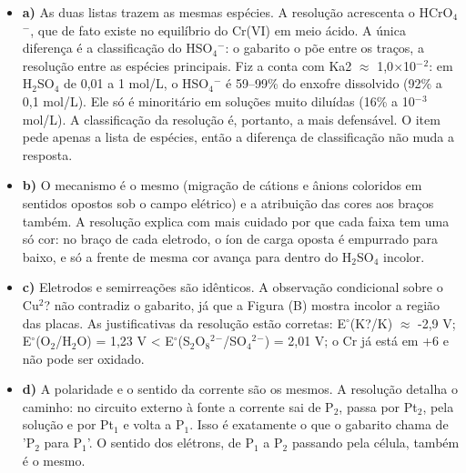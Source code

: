 \documentclass{article}%
\begin{document}
\begin{itemize}%
\item%
\textbf{a)} As duas listas trazem as mesmas espécies. A resolução acrescenta o HCrO$_{4}$$^{-}$, que de fato existe no equilíbrio do Cr(VI) em meio ácido. A única diferença é a classificação do HSO$_{4}$$^{-}$: o gabarito o põe entre os traços, a resolução entre as espécies principais. Fiz a conta com Ka2 $\approx$ 1,0$\times$10$^{-}$$^2$: em H$_{2}$SO$_{4}$ de 0,01 a 1 mol/L, o HSO$_{4}$$^{-}$ é 59--99\% do enxofre dissolvido (92\% a 0,1 mol/L). Ele só é minoritário em soluções muito diluídas (16\% a 10$^{-}$$^3$ mol/L). A classificação da resolução é, portanto, a mais defensável. O item pede apenas a lista de espécies, então a diferença de classificação não muda a resposta.%
\item%
\textbf{b)} O mecanismo é o mesmo (migração de cátions e ânions coloridos em sentidos opostos sob o campo elétrico) e a atribuição das cores aos braços também. A resolução explica com mais cuidado por que cada faixa tem uma só cor: no braço de cada eletrodo, o íon de carga oposta é empurrado para baixo, e só a frente de mesma cor avança para dentro do H$_{2}$SO$_{4}$ incolor.%
\item%
\textbf{c)} Eletrodos e semirreações são idênticos. A observação condicional sobre o Cu$^2$? não contradiz o gabarito, já que a Figura (B) mostra incolor a região das placas. As justificativas da resolução estão corretas: E$^\circ$(K?/K) $\approx$ -2,9 V; E$^\circ$(O$_{2}$/H$_{2}$O) = 1,23 V < E$^\circ$(S$_{2}$O$_{8}$$^2$$^{-}$/SO$_{4}$$^2$$^{-}$) = 2,01 V; o Cr já está em +6 e não pode ser oxidado.%
\item%
\textbf{d)} A polaridade e o sentido da corrente são os mesmos. A resolução detalha o caminho: no circuito externo à fonte a corrente sai de P$_{2}$, passa por Pt$_{2}$, pela solução e por Pt$_{1}$ e volta a P$_{1}$. Isso é exatamente o que o gabarito chama de 'P$_{2}$ para P$_{1}$'. O sentido dos elétrons, de P$_{1}$ a P$_{2}$ passando pela célula, também é o mesmo.%
\end{itemize}%
\end{document}
